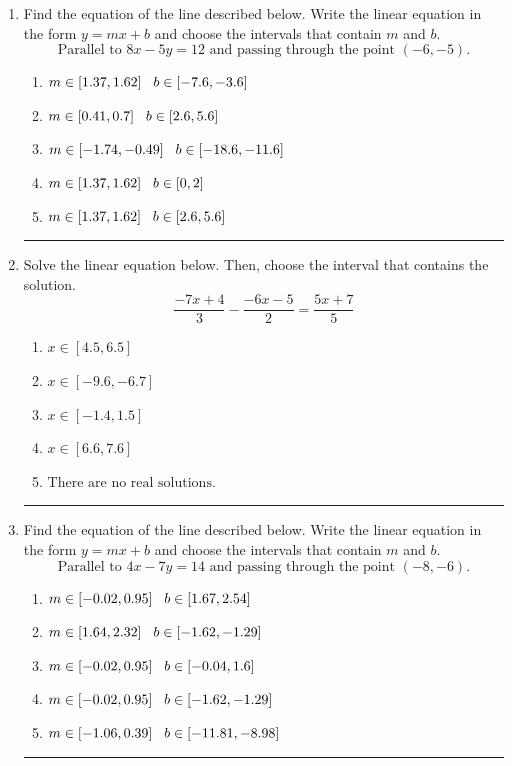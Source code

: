 \documentclass[14pt]{extbook}
\newcommand{\litem}[1]{\item#1\hspace*{-1cm}\rule{\textwidth}{0.4pt}}
\begin{document}
\begin{enumerate}
{\begin{enumerate}[label=\Alph*.]
\end{enumerate} }
\litem{
Find the equation of the line described below. Write the linear equation in the form $ y=mx+b $ and choose the intervals that contain $m$ and $b$.\[ \text{Parallel to } 8 x - 5 y = 12 \text{ and passing through the point } (-6, -5). \]\begin{enumerate}[label=\Alph*.]
\item \( m \in [1.37, 1.62] \hspace*{3mm} b \in [-7.6, -3.6] \)
\item \( m \in [0.41, 0.7] \hspace*{3mm} b \in [2.6, 5.6] \)
\item \( m \in [-1.74, -0.49] \hspace*{3mm} b \in [-18.6, -11.6] \)
\item \( m \in [1.37, 1.62] \hspace*{3mm} b \in [0, 2] \)
\item \( m \in [1.37, 1.62] \hspace*{3mm} b \in [2.6, 5.6] \)

\end{enumerate} }
\litem{
Solve the linear equation below. Then, choose the interval that contains the solution.\[ \frac{-7x + 4}{3} - \frac{-6x -5}{2} = \frac{5x + 7}{5} \]\begin{enumerate}[label=\Alph*.]
\item \( x \in [4.5, 6.5] \)
\item \( x \in [-9.6, -6.7] \)
\item \( x \in [-1.4, 1.5] \)
\item \( x \in [6.6, 7.6] \)
\item \( \text{There are no real solutions.} \)

\end{enumerate} }
\litem{
Find the equation of the line described below. Write the linear equation in the form $ y=mx+b $ and choose the intervals that contain $m$ and $b$.\[ \text{Parallel to } 4 x - 7 y = 14 \text{ and passing through the point } (-8, -6). \]\begin{enumerate}[label=\Alph*.]
\item \( m \in [-0.02, 0.95] \hspace*{3mm} b \in [1.67, 2.54] \)
\item \( m \in [1.64, 2.32] \hspace*{3mm} b \in [-1.62, -1.29] \)
\item \( m \in [-0.02, 0.95] \hspace*{3mm} b \in [-0.04, 1.6] \)
\item \( m \in [-0.02, 0.95] \hspace*{3mm} b \in [-1.62, -1.29] \)
\item \( m \in [-1.06, 0.39] \hspace*{3mm} b \in [-11.81, -8.98] \)


\end{enumerate}}
\end{enumerate}
\end{document}
